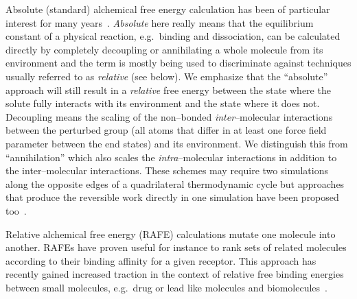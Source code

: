 \documentclass[journal=jctcce,manuscript=article]{achemso}
\begin{document}
Absolute (standard) alchemical free energy calculation has been of 
particular interest for many years~\cite{GILSON19971047,
  doi:10.1021/jp0217839, deng_computations_2009, ytreberg_comparison_2006, doi:10.1021/ct500964e, jorgensen1988efficient}.  \emph{Absolute}
here really means that the equilibrium constant of a physical
reaction, e.g.\ binding and dissociation, can be calculated directly
by completely decoupling or annihilating a whole molecule from its environment 
and the term is mostly being used to discriminate against techniques usually 
referred to as \emph{relative} (see below).  We emphasize that the 
``absolute'' approach will still result in a \emph{relative} free energy 
between the state where the solute fully interacts with its environment and the state where it does 
not.  Decoupling means the scaling of the non--bonded 
\emph{inter}--molecular interactions between the perturbed group (all atoms 
that differ in at least one force field parameter between the end states) and 
its environment.  We distinguish this from ``annihilation'' which also
scales the \emph{intra}--molecular interactions in addition to the 
inter--molecular interactions. These schemes may require two 
simulations along the opposite edges of a quadrilateral thermodynamic cycle 
but approaches that produce the reversible work directly in one simulation
have been proposed too~\cite{doi:10.1063/1.3519057, C3FD00125C}.

Relative alchemical free energy (RAFE) calculations mutate one molecule into 
another.  RAFEs have proven useful for instance to rank sets of related 
molecules according to their binding affinity for a given receptor.  This 
approach has recently gained increased traction in the context of relative free 
binding energies between small molecules, e.g.\ drug or lead like molecules and 
biomolecules~\cite{doi:10.1021/ja512751q, doi:10.1021/acs.jctc.6b00991}.
\end{document}
